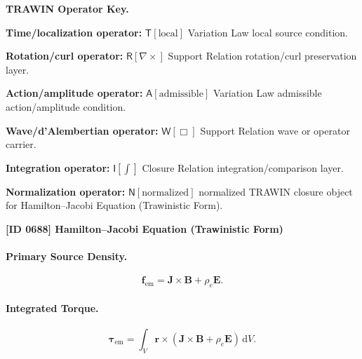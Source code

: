 \par\vspace{0.45\baselineskip}
\noindent\begin{minipage}[t]{\linewidth}
\begingroup
\small
\raggedright
\textbf{TRAWIN Operator Key.}\par
\noindent\textbf{Time/localization operator:} $\mathsf{T}\!\left[\mathrm{local}\right]$ Variation Law local source condition.\par
\noindent\textbf{Rotation/curl operator:} $\mathsf{R}\!\left[\nabla\times\right]$ Support Relation rotation/curl preservation layer.\par
\noindent\textbf{Action/amplitude operator:} $\mathsf{A}\!\left[\mathrm{admissible}\right]$ Variation Law admissible action/amplitude condition.\par
\noindent\textbf{Wave/d'Alembertian operator:} $\mathsf{W}\!\left[\Box\right]$ Support Relation wave or operator carrier.\par
\noindent\textbf{Integration operator:} $\mathsf{I}\!\left[\int\right]$ Closure Relation integration/comparison layer.\par
\noindent\textbf{Normalization operator:} $\mathsf{N}\!\left[\mathrm{normalized}\right]$ normalized TRAWIN closure object for Hamilton--Jacobi Equation (Trawinistic Form).\par
\endgroup
\end{minipage}

\clearpage
\noindent\textbf{[ID 0688] Hamilton--Jacobi Equation (Trawinistic Form)}\par
\vspace{0.35em}
\paragraph{Primary Source Density.}
\begin{equation}
\mathbf{f}_{\mathrm{em}}
=
\mathbf{J}\times\mathbf{B}
+
\rho_e\mathbf{E}.
\end{equation}

\paragraph{Integrated Torque.}
\begin{equation}
\boldsymbol{\tau}_{\mathrm{em}}
=
\int_V
\mathbf{r}\times
\left(
\mathbf{J}\times\mathbf{B}
+
\rho_e\mathbf{E}
\right)
\,\mathrm{d}V .
\end{equation}

